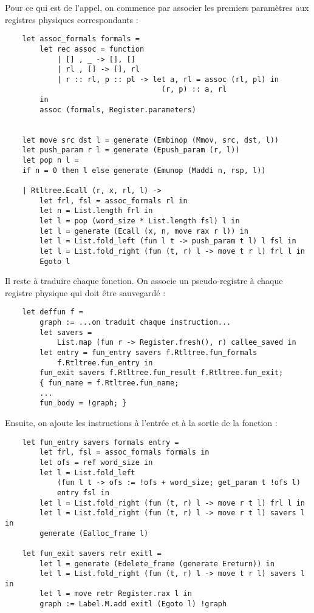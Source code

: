 \documentclass{cours}
\begin{document}
Pour ce qui est de l'appel, on commence par associer les premiers paramètres aux registres physiques correspondants : 
\begin{verbatim}
    let assoc_formals formals =
        let rec assoc = function
            | [] , _ -> [], []
            | rl , [] -> [], rl
            | r :: rl, p :: pl -> let a, rl = assoc (rl, pl) in
                                    (r, p) :: a, rl
        in
        assoc (formals, Register.parameters)


    let move src dst l = generate (Embinop (Mmov, src, dst, l))
    let push_param r l = generate (Epush_param (r, l))
    let pop n l =
    if n = 0 then l else generate (Emunop (Maddi n, rsp, l))

    | Rtltree.Ecall (r, x, rl, l) ->
        let frl, fsl = assoc_formals rl in
        let n = List.length frl in
        let l = pop (word_size * List.length fsl) l in
        let l = generate (Ecall (x, n, move rax r l)) in
        let l = List.fold_left (fun l t -> push_param t l) l fsl in
        let l = List.fold_right (fun (t, r) l -> move t r l) frl l in
        Egoto l
\end{verbatim}
Il reste à traduire chaque fonction. On associe un pseudo-registre à chaque registre physique qui doit être sauvegardé : 
\begin{verbatim}
    let deffun f =
        graph := ...on traduit chaque instruction...
        let savers =
            List.map (fun r -> Register.fresh(), r) callee_saved in
        let entry = fun_entry savers f.Rtltree.fun_formals
            f.Rtltree.fun_entry in
        fun_exit savers f.Rtltree.fun_result f.Rtltree.fun_exit;
        { fun_name = f.Rtltree.fun_name;
        ...
        fun_body = !graph; }
\end{verbatim}
Ensuite, on ajoute les instructions à l'entrée et à la sortie de la fonction : 
\begin{verbatim}
    let fun_entry savers formals entry =
        let frl, fsl = assoc_formals formals in
        let ofs = ref word_size in
        let l = List.fold_left
            (fun l t -> ofs := !ofs + word_size; get_param t !ofs l)
            entry fsl in
        let l = List.fold_right (fun (t, r) l -> move r t l) frl l in
        let l = List.fold_right (fun (t, r) l -> move r t l) savers l in
        generate (Ealloc_frame l)

    let fun_exit savers retr exitl =
        let l = generate (Edelete_frame (generate Ereturn)) in
        let l = List.fold_right (fun (t, r) l -> move t r l) savers l in
        let l = move retr Register.rax l in
        graph := Label.M.add exitl (Egoto l) !graph
\end{verbatim}
\end{document}
